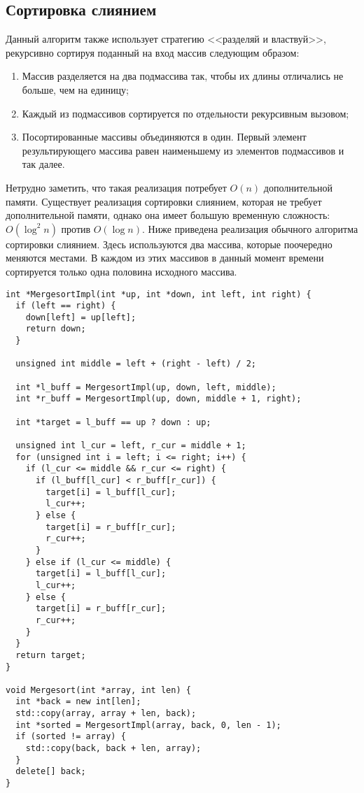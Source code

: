 \subsection{Сортировка слиянием}
Данный алгоритм также использует стратегию <<разделяй и властвуй>>, рекурсивно сортируя
поданный на вход массив следующим образом:
\begin{enumerate}
  \item Массив разделяется на два подмассива так, чтобы их длины отличались не больше,
        чем на единицу;
  \item Каждый из подмассивов сортируется по отдельности рекурсивным вызовом;
  \item Посортированные массивы объединяются в один. Первый элемент результирующего 
        массива равен наименьшему из элементов подмассивов и так далее.
\end{enumerate}

Нетрудно заметить, что такая реализация потребует $O(n)$ дополнительной памяти.
Существует реализация сортировки слиянием, которая не требует дополнительной памяти,
однако она имеет большую временную сложность: $O(\log^2 n)$ против $O(\log n)$.
Ниже приведена реализация обычного алгоритма сортировки слиянием. Здесь используются
два массива, которые поочередно меняются местами. В каждом из этих массивов
в данный момент времени сортируется только одна половина исходного массива.

\begin{verbatim}
int *MergesortImpl(int *up, int *down, int left, int right) {
  if (left == right) {
    down[left] = up[left];
    return down;
  }

  unsigned int middle = left + (right - left) / 2;

  int *l_buff = MergesortImpl(up, down, left, middle);
  int *r_buff = MergesortImpl(up, down, middle + 1, right);

  int *target = l_buff == up ? down : up;

  unsigned int l_cur = left, r_cur = middle + 1;
  for (unsigned int i = left; i <= right; i++) {
    if (l_cur <= middle && r_cur <= right) {
      if (l_buff[l_cur] < r_buff[r_cur]) {
        target[i] = l_buff[l_cur];
        l_cur++;
      } else {
        target[i] = r_buff[r_cur];
        r_cur++;
      }
    } else if (l_cur <= middle) {
      target[i] = l_buff[l_cur];
      l_cur++;
    } else {
      target[i] = r_buff[r_cur];
      r_cur++;
    }
  }
  return target;
}

void Mergesort(int *array, int len) {
  int *back = new int[len];
  std::copy(array, array + len, back);
  int *sorted = MergesortImpl(array, back, 0, len - 1);
  if (sorted != array) {
    std::copy(back, back + len, array);
  }
  delete[] back;
}
\end{verbatim}

